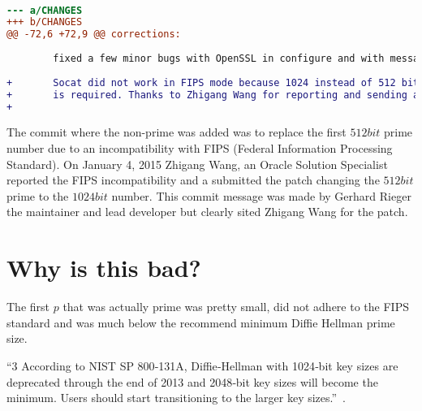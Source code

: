 \documentclass[letterpaper,11pt,notitlepage,fleqn]{article}
\begin{document}
\\
\begin{lstlisting}[language=diff]
--- a/CHANGES
+++ b/CHANGES
@@ -72,6 +72,9 @@ corrections:
 
        fixed a few minor bugs with OpenSSL in configure and with messages
 
+       Socat did not work in FIPS mode because 1024 instead of 512 bit DH prime
+       is required. Thanks to Zhigang Wang for reporting and sending a patch.
+
\end{lstlisting}
The commit where the non-prime was added was to replace the first $512 bit$ prime number due to an incompatibility with FIPS (Federal Information Processing Standard). On January 4, 2015 Zhigang Wang, an Oracle Solution Specialist reported the FIPS incompatibility and a submitted the patch changing the $512 bit$ prime to the $1024 bit$ number. This commit message was made by Gerhard Rieger the maintainer and lead developer but clearly sited Zhigang Wang for the patch.
\section{Why is this bad?}
\indent The first $p$ that was actually prime was pretty small, did not adhere to the FIPS standard and was much below the recommend minimum Diffie Hellman prime size.

``3 According to NIST SP 800‐131A, Diffie‐Hellman with 1024‐bit key sizes are deprecated through the end of 2013 and 2048‐bit key sizes will become the minimum. Users should start transitioning to the larger key sizes.''~\cite{FIPS}. 
\end{document}
